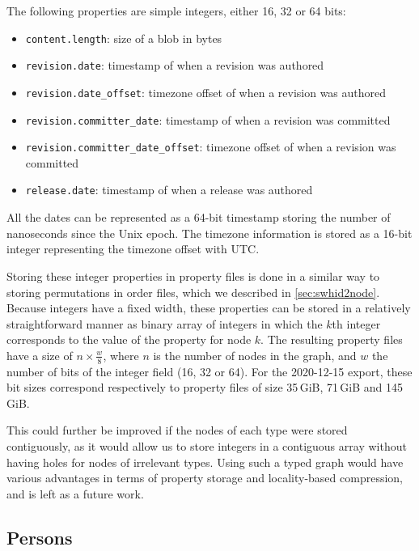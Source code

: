 The following properties are simple integers, either 16, 32 or 64 bits:

\begin{itemize}
    \setlength\itemsep{0em}
    \item \texttt{content.length}: size of a blob in bytes
    \item \texttt{revision.date}: timestamp of when a revision was authored
    \item \texttt{revision.date\_offset}: timezone offset of when a revision
        was authored
    \item \texttt{revision.committer\_date}: timestamp of when a revision was
        committed
    \item \texttt{revision.committer\_date\_offset}: timezone offset of when a
        revision was committed
    \item \texttt{release.date}: timestamp of when a release was authored
\end{itemize}

All the dates can be represented as a 64-bit timestamp storing the number of
nanoseconds since the Unix epoch. The timezone information is stored as a
16-bit integer representing the timezone offset with UTC\@.

Storing these integer properties in property files is done in a similar way
to storing permutations in order files, which we described in
\cref{sec:swhid2node}. Because integers have a fixed width, these properties
can be stored in a relatively straightforward manner as binary array of
integers in which the $k$th integer corresponds to the value of the property
for node $k$.  The resulting property files have a size of {\Large $n \times
\frac{w}{8}$}, where $n$ is the number of nodes in the graph, and $w$ the
number of bits of the integer field (16, 32 or 64). For the 2020-12-15 export,
these bit sizes correspond respectively to property files of size 35\,GiB,
71\,GiB and 145\,GiB.

This could further be improved if the nodes of each type were stored
contiguously, as it would allow us to store integers in a contiguous array
without having holes for nodes of irrelevant types. Using such a typed graph
would have various advantages in terms of property storage and locality-based
compression, and is left as a future work.

\subsection{Persons}%
\label{sec:mapping-persons}

